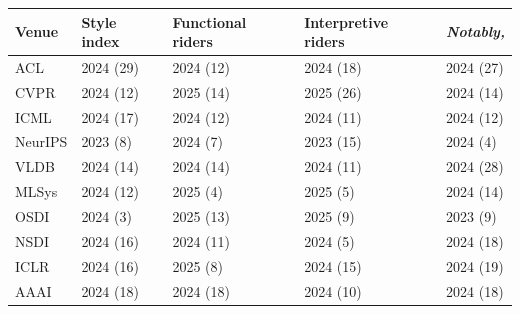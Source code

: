 \begin{tabular}{l llll}
\toprule
Venue & Style index & Functional riders & Interpretive riders & \textit{Notably,} \\
\midrule
ACL & 2024 (29) & 2024 (12) & 2024 (18) & 2024 (27) \\
CVPR & 2024 (12) & 2025 (14) & 2025 (26) & 2024 (14) \\
ICML & 2024 (17) & 2024 (12) & 2024 (11) & 2024 (12) \\
NeurIPS & 2023 (8) & 2024 (7) & 2023 (15) & 2024 (4) \\
VLDB & 2024 (14) & 2024 (14) & 2024 (11) & 2024 (28) \\
MLSys & 2024 (12) & 2025 (4) & 2025 (5) & 2024 (14) \\
OSDI & 2024 (3) & 2025 (13) & 2025 (9) & 2023 (9) \\
NSDI & 2024 (16) & 2024 (11) & 2024 (5) & 2024 (18) \\
ICLR & 2024 (16) & 2025 (8) & 2024 (15) & 2024 (19) \\
AAAI & 2024 (18) & 2024 (18) & 2024 (10) & 2024 (18) \\
\bottomrule
\end{tabular}
